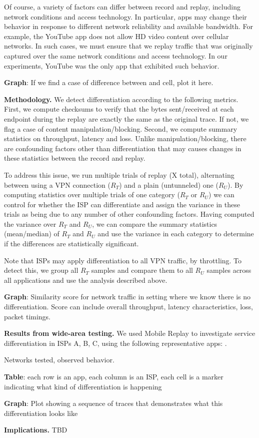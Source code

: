Of course, a variety of factors can differ between record and replay, including network 
conditions and access technology. In particular, apps may change their behavior in response 
to different network reliability and available bandwidth. For example, the YouTube app does not 
allow HD video content over cellular networks. In such cases, we must ensure that we replay 
traffic that was originally captured over the same network conditions and access technology. 
In our experiments, YouTube was the only app that exhibited such behavior.


\textbf{Graph}: If we find a case of difference between \wifi and cell, plot it here.



\noindent\textbf{Methodology.} We detect differentiation according to the following metrics. First, we 
compute checksums to verify that the bytes sent/received at each endpoint during the replay are 
exactly the same as the original trace. If not, we flag a case of content manipulation/blocking. Second, we
compute summary statistics on throughput, latency and loss. Unlike manipulation/blocking, there are 
confounding factors other than differentiation that may causes changes in these statistics between the 
record and replay.

To address this issue, we run multiple trials of replay (X total), alternating between using a VPN connection ($R_T$) and 
a plain (untunneled) one ($R_U$). By computing statistics over multiple trials of one category ($R_T$ or $R_U$) we 
can control for whether the ISP can differentiate and assign the variance in these trials as being due to 
any number of other confounding factors. Having computed the variance over $R_T$ and $R_U$, we can 
compare the summary statistics (mean/median) of $R_T$ and $R_U$ and use the variance in each category 
to determine if the differences are statistically significant.

Note that ISPs may apply differentiation to all VPN traffic, \eg by throttling. To detect this, we group all $R_T$ 
samples and compare them to all $R_U$ samples across all applications and use the analysis described above. 

\textbf{Graph}: Similarity score for network traffic in setting where we know there is no differentiation. 
Score can include overall throughput, latency characteristics, loss, packet timings.

\noindent\textbf{Results from wide-area testing.} We used Mobile Replay to investigate service differentiation in 
ISPs A, B, C,  using the following representative apps: . 
 
Networks tested, observed behavior.

\textbf{Table}: each row is an app, each column is an ISP, each cell is a marker indicating what kind of 
differentiation is happening

\textbf{Graph}: Plot showing a sequence of traces that demonstrates what this differentiation looks like


\noindent\textbf{Implications.}  TBD 
